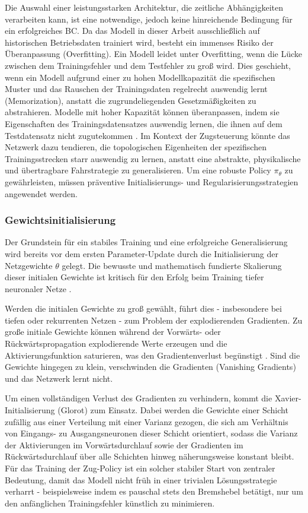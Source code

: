 Die Auswahl einer leistungsstarken Architektur, die zeitliche Abhängigkeiten verarbeiten kann, ist eine notwendige, jedoch keine hinreichende Bedingung für ein erfolgreiches \gls{BC}. 
Da das Modell in dieser Arbeit ausschließlich auf historischen Betriebsdaten trainiert wird, besteht ein immenses Risiko der Überanpassung (Overfitting). 
Ein Modell leidet unter Overfitting, wenn die Lücke zwischen dem Trainingsfehler und dem Testfehler zu groß wird. Dies geschieht, wenn ein Modell aufgrund einer zu hohen Modellkapazität die spezifischen Muster und das Rauschen der Trainingsdaten regelrecht auswendig lernt (Memorization), anstatt die zugrundeliegenden Gesetzmäßigkeiten zu abstrahieren. 
Modelle mit hoher Kapazität können überanpassen, indem sie Eigenschaften des Trainingsdatensatzes auswendig lernen, die ihnen auf dem Testdatensatz nicht zugutekommen \cite[vgl.~S.~111]{chap2_Goo16}.
Im Kontext der Zugsteuerung könnte das Netzwerk dazu tendieren, die topologischen Eigenheiten der spezifischen Trainingsstrecken starr auswendig zu lernen, anstatt eine abstrakte, physikalische und übertragbare Fahrstrategie zu generalisieren. 
Um eine robuste Policy $\pi_\theta$ zu gewährleisten, müssen präventive Initialisierungs- und Regularisierungsstrategien angewendet werden.

\subsubsection{Gewichtsinitialisierung}

Der Grundstein für ein stabiles Training und eine erfolgreiche Generalisierung wird bereits vor dem ersten Parameter-Update durch die Initialisierung der Netzgewichte $\theta$ gelegt. 
Die bewusste und mathematisch fundierte Skalierung dieser initialen Gewichte ist kritisch für den Erfolg beim Training tiefer neuronaler Netze \cite[vgl.][S.~301ff.]{chap2_Goo16}. 

Werden die initialen Gewichte zu groß gewählt, führt dies - insbesondere bei tiefen oder rekurrenten Netzen - zum Problem der explodierenden Gradienten. 
Zu große initiale Gewichte können während der Vorwärts- oder Rückwärtspropagation explodierende Werte erzeugen und die Aktivierungsfunktion saturieren, was den Gradientenverlust begünstigt \cite[vgl.~S.~301]{chap2_Goo16}. 
Sind die Gewichte hingegen zu klein, verschwinden die Gradienten (Vanishing Gradients) und das Netzwerk lernt nicht. 

Um einen vollständigen Verlust des Gradienten zu verhindern, kommt die Xavier-Initialisierung (Glorot) zum Einsatz. 
Dabei werden die Gewichte einer Schicht zufällig aus einer Verteilung mit einer Varianz gezogen, die sich am Verhältnis von Eingangs- zu Ausgangsneuronen dieser Schicht orientiert, sodass die Varianz der Aktivierungen im Vorwärtsdurchlauf sowie der Gradienten im Rückwärtsdurchlauf über alle Schichten hinweg näherungsweise konstant bleibt. 
Für das Training der Zug-Policy ist ein solcher stabiler Start von zentraler Bedeutung, damit das Modell nicht früh in einer trivialen Lösungsstrategie verharrt - beispielsweise indem es pauschal stets den Bremshebel betätigt, nur um den anfänglichen Trainingsfehler künstlich zu minimieren.


